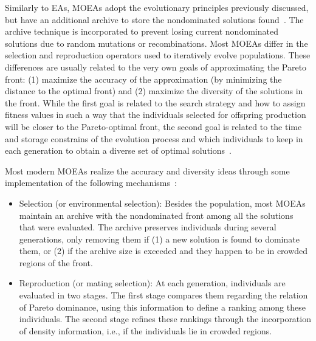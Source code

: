 	Similarly to \acp{EA}, \acp{MOEA} adopt the evolutionary principles previously discussed, but have an additional archive to store the nondominated solutions found~\cite{Zitzler2001SPEA2}. The archive technique is incorporated to prevent losing current nondominated solutions due to random mutations or recombinations. Most \acp{MOEA} differ in the selection and reproduction operators used to iteratively evolve populations. These differences are usually related to the very own goals of approximating the Pareto front: (1) maximize the accuracy of the approximation (by minimizing the distance to the optimal front) and (2) maximize the diversity of the solutions in the front. While the first goal is related to the search strategy and how to assign fitness values in such a way that the individuals selected for offspring production will be closer to the Pareto-optimal front, the second goal is related to the time and storage constrains of the evolution process and which individuals to keep in each generation to obtain a diverse set of optimal solutions~\cite{Zitzler2001SPEA2}.
	
	Most modern \acp{MOEA} realize the accuracy and diversity ideas through some implementation of the following mechanisms~\cite{Zitzler2001SPEA2}:	
	\begin{itemize}
		\item Selection (or environmental selection): Besides the population, most \acp{MOEA} maintain an archive with the nondominated front among all the solutions that were evaluated. The archive preserves individuals during several generations, only removing them if (1) a new solution is found to dominate them, or (2) if the archive size is exceeded and they happen to be in crowded regions of the front.
		
		\item Reproduction (or mating selection): At each generation, individuals are evaluated in two stages. The first stage compares them regarding the relation of Pareto dominance, using this information to define a ranking among these individuals. The second stage refines these rankings through the incorporation of density information, i.e., if the individuals lie in crowded regions.
	\end{itemize}
	
